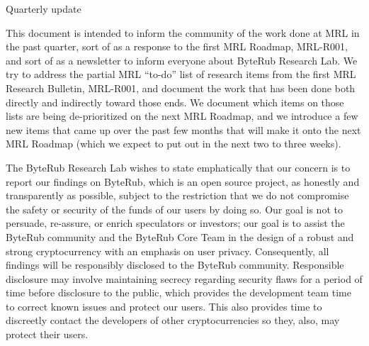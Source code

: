 \documentclass[12pt,english]{mrl}
\theoremstyle{definition}
\numberwithin{equation}{section}
\numberwithin{figure}{section}
\numberwithin{equation}{section}
\numberwithin{equation}{section}
\numberwithin{figure}{section}
\begin{document}
\begin{frontmatter}

\begin{fmbox}
{\huge\sffamily Quarterly update} \hfill\setlength{\fboxrule}{0px}\setlength{\fboxsep}{5px}
\dochead{}
\date{\today}
\author[
   addressref={mrl},
   email={bggoode@g.clemson.edu}
]{ }


\address[id=mrl]{
}
\end{fmbox}

\end{frontmatter}

This document is intended to inform the community of the work done at MRL in the past quarter, sort of as a response to the first MRL Roadmap, MRL-R001, and sort of as a newsletter to inform everyone about ByteRub Research Lab. We try to address the partial MRL ``to-do'' list of research items from the first MRL Research Bulletin, MRL-R001, and document the work that has been done both directly and indirectly toward those ends. We document which items on those lists are being de-prioritized on the next MRL Roadmap, and we introduce a few new items that came up over the past few months that will make it onto the next MRL Roadmap (which we expect to put out in the next two to three weeks).

The ByteRub Research Lab wishes to state emphatically that our concern is to report our findings on ByteRub, which is an open source project, as honestly and transparently as possible, subject to the restriction that we do not compromise the safety or security of the funds of our users by doing so. Our goal is not to persuade, re-assure, or enrich speculators or investors; our goal is to assist the ByteRub community and the ByteRub Core Team in the design of a robust and strong cryptocurrency with an emphasis on user privacy.  Consequently, all findings will be responsibly disclosed to the ByteRub community. Responsible disclosure may involve maintaining secrecy regarding security flaws for a period of time before disclosure to the public, which provides the development team time to correct known issues and protect our users. This also provides time to discreetly contact the developers of other cryptocurrencies so they, also, may protect their users.
\end{document}
